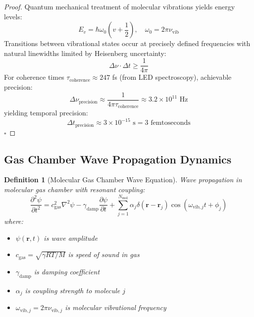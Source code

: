 \documentclass[12pt,a4paper]{article}
\newtheorem{definition}[theorem]{Definition}
\begin{document}
\begin{proof}
Quantum mechanical treatment of molecular vibrations yields energy levels:
\begin{equation}
E_v = \hbar \omega_0 \left(v + \frac{1}{2}\right), \quad \omega_0 = 2\pi\nu_{\text{vib}}
\end{equation}
Transitions between vibrational states occur at precisely defined frequencies with natural linewidths limited by Heisenberg uncertainty:
\begin{equation}
\Delta \nu \cdot \Delta t \geq \frac{1}{4\pi}
\end{equation}
For coherence times $\tau_{\text{coherence}} \approx 247$ fs (from LED spectroscopy), achievable precision:
\begin{equation}
\Delta \nu_{\text{precision}} \approx \frac{1}{4\pi \tau_{\text{coherence}}} \approx 3.2 \times 10^{11} \text{ Hz}
\end{equation}
yielding temporal precision:
\begin{equation}
\Delta t_{\text{precision}} \approx 3 \times 10^{-15} \text{ s} = 3 \text{ femtoseconds}
\end{equation}
$\square$
\end{proof}

\subsection{Gas Chamber Wave Propagation Dynamics}

\begin{definition}[Molecular Gas Chamber Wave Equation]
Wave propagation in molecular gas chamber with resonant coupling:
\begin{equation}
\frac{\partial^2 \psi}{\partial t^2} = c_{\text{gas}}^2 \nabla^2 \psi - \gamma_{\text{damp}} \frac{\partial \psi}{\partial t} + \sum_{j=1}^{N_{\text{mol}}} \alpha_j \delta(\mathbf{r} - \mathbf{r}_j) \cos(\omega_{\text{vib},j} t + \phi_j)
\end{equation}
where:
\begin{itemize}
\item $\psi(\mathbf{r}, t)$ is wave amplitude
\item $c_{\text{gas}} = \sqrt{\gamma RT/M}$ is speed of sound in gas
\item $\gamma_{\text{damp}}$ is damping coefficient
\item $\alpha_j$ is coupling strength to molecule $j$
\item $\omega_{\text{vib},j} = 2\pi\nu_{\text{vib},j}$ is molecular vibrational frequency
\end{itemize}
\end{definition}
\end{document}
